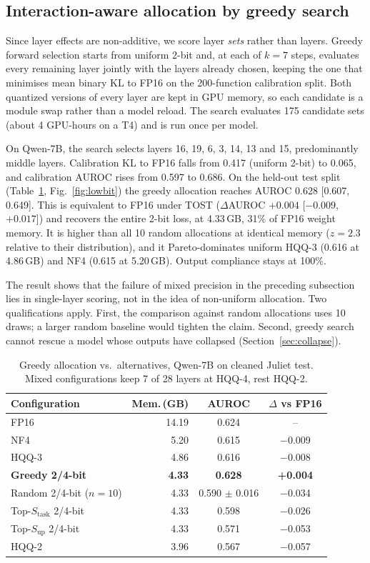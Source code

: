 \documentclass[conference]{IEEEtran}
\newcommand{\stask}{S_{\text{task}}}
\newcommand{\sUp}{S_{\text{up}}}
\begin{document}
\subsection{Interaction-aware allocation by greedy search}\label{sec:greedy}
Since layer effects are non-additive, we score layer \emph{sets} rather than layers. Greedy forward selection starts from uniform 2-bit and, at each of $k=7$ steps, evaluates every remaining layer jointly with the layers already chosen, keeping the one that minimises mean binary KL to FP16 on the 200-function calibration split. Both quantized versions of every layer are kept in GPU memory, so each candidate is a module swap rather than a model reload. The search evaluates 175 candidate sets (about 4 GPU-hours on a T4) and is run once per model.

On Qwen-7B, the search selects layers 16, 19, 6, 3, 14, 13 and 15, predominantly middle layers. Calibration KL to FP16 falls from 0.417 (uniform 2-bit) to 0.065, and calibration AUROC rises from 0.597 to 0.686. On the held-out test split (Table~\ref{tab:greedy}, Fig.~\ref{fig:lowbit}) the greedy allocation reaches AUROC 0.628 [0.607, 0.649]. This is equivalent to FP16 under TOST ($\Delta$AUROC $+0.004$ [$-0.009$, $+0.017$]) and recovers the entire 2-bit loss, at 4.33\,GB, 31\% of FP16 weight memory. It is higher than all 10 random allocations at identical memory ($z = 2.3$ relative to their distribution), and it Pareto-dominates uniform HQQ-3 (0.616 at 4.86\,GB) and NF4 (0.615 at 5.20\,GB). Output compliance stays at 100\%.

The result shows that the failure of mixed precision in the preceding subsection lies in single-layer scoring, not in the idea of non-uniform allocation. Two qualifications apply. First, the comparison against random allocations uses 10 draws; a larger random baseline would tighten the claim. Second, greedy search cannot rescue a model whose outputs have collapsed (Section~\ref{sec:collapse}).

\begin{table}[t]
\centering
\caption{Greedy allocation vs.\ alternatives, Qwen-7B on cleaned Juliet test. Mixed configurations keep 7 of 28 layers at HQQ-4, rest HQQ-2.}
\label{tab:greedy}
\begin{tabular}{lrcc}
\toprule
Configuration & Mem.\,(GB) & AUROC & $\Delta$ vs FP16 \\
\midrule
FP16 & 14.19 & 0.624 & -- \\
NF4 & 5.20 & 0.615 & $-$0.009 \\
HQQ-3 & 4.86 & 0.616 & $-$0.008 \\
\textbf{Greedy 2/4-bit} & \textbf{4.33} & \textbf{0.628} & \textbf{+0.004} \\
Random 2/4-bit ($n=10$) & 4.33 & 0.590 $\pm$ 0.016 & $-$0.034 \\
Top-$\stask$ 2/4-bit & 4.33 & 0.598 & $-$0.026 \\
Top-$\sUp$ 2/4-bit & 4.33 & 0.571 & $-$0.053 \\
HQQ-2 & 3.96 & 0.567 & $-$0.057 \\
\bottomrule
\end{tabular}
\end{table}
\end{document}
